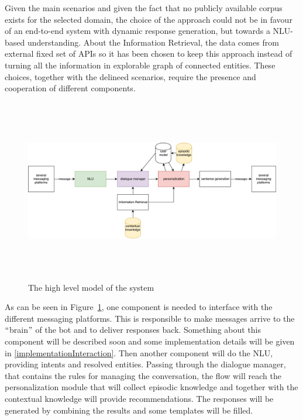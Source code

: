 Given the main scenarios and given the fact that no publicly available corpus exists for the selected domain, the choice of the approach could not be in favour of an end-to-end system with dynamic response generation, but towards a NLU-based understanding. About the Information Retrieval, the data comes from external fixed set of APIs so it has been chosen to keep this approach instead of turning all the information in explorable graph of connected entities. These choices, together with the delineed scenarios, require the presence and cooperation of different components.


\begin{figure}[!htbp]
    \centering
    \includegraphics[max width=\linewidth,max height=8cm,keepaspectratio]{figures/systemHighLevel}
    \caption{The high level model of the system}\label{fig:systemHighLevel}
\end{figure}

As can be seen in Figure~\ref{fig:systemHighLevel}, one component is needed to interface with the different messaging platforms. This is responsible to make messages arrive to the $``$brain$"$  of the bot and to deliver responses back. Something about this component will be described soon and some implementation details will be given in \ref{implementationInteraction}. Then another component will do the NLU, providing intents and resolved entities. Passing through the dialogue manager, that contains the rules for managing the conversation, the flow will reach the personalization module that will collect episodic knowledge and together with the contextual knowledge will provide recommendations. The responses will be generated by combining the results and some templates will be filled.

